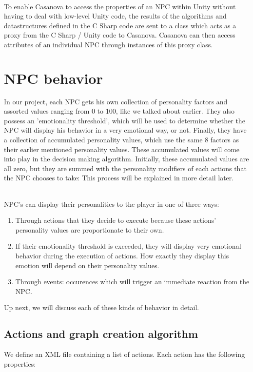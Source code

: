 \documentclass[11pt]{article} %
\begin{document}
~\\
To enable Casanova to access the properties of an NPC within Unity without having to deal with low-level Unity code, the results of the  algorithms and datastructures defined in the C Sharp code are sent to a class which acts as a proxy from the C Sharp / Unity code to Casanova. Casanova can then access attributes of an individual NPC through instances of this proxy class.

\newpage
\section{NPC behavior}
In our project, each NPC gets his own collection of personality factors and assorted values ranging from 0 to 100, like we talked about earlier. They also possess an 'emotionality threshold', which will be used to determine whether the NPC will display his behavior in a very emotional way, or not. Finally, they have a collection of accumulated personality values, which use the same 8 factors as their earlier mentioned personality values. These accumulated values will come into play in the decision making algorithm. Initially, these accumulated values are all zero, but they are summed with the personality modifiers of each actions that the NPC chooses to take: This process will be explained in more detail later.

~\\
NPC's can display their personalities to the player in one of three ways:
\begin{enumerate}
\item Through actions that they decide to execute because these actions' personality values are proportionate to their own.
\item If their emotionality threshold is exceeded, they will display very emotional behavior during the execution of actions. How exactly they display this emotion will depend on their personality values.
\item Through events: occurences which will trigger an immediate reaction from the NPC.
\end{enumerate}

Up next, we will discuss each of these kinds of behavior in detail.

\subsection{Actions and graph creation algorithm}
We define an XML file containing a list of actions. Each action has the following properties:
\end{document}
